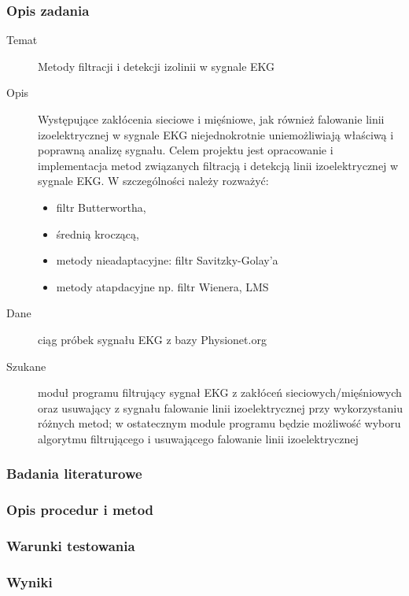 \documentclass[a4paper, 11pt]{article}
\begin{document}
\subsubsection{Opis zadania}
\label{sec:baseline:desc}

\begin{description}
\item[Temat] Metody filtracji i detekcji izolinii w sygnale EKG
\item[Opis] Występujące zakłócenia sieciowe i mięśniowe, jak również falowanie linii izoelektrycznej w sygnale EKG niejednokrotnie uniemożliwiają właściwą i poprawną analizę sygnału. Celem projektu jest opracowanie i implementacja metod związanych filtracją i detekcją linii izoelektrycznej w sygnale EKG. W szczególności należy rozważyć:
  \begin{itemize}
  \item filtr Butterwortha,
  \item średnią kroczącą,
  \item metody nieadaptacyjne: filtr Savitzky-Golay’a
  \item metody atapdacyjne np. filtr Wienera, LMS
  \end{itemize}
\item[Dane] ciąg próbek sygnału EKG z bazy Physionet.org
\item[Szukane] moduł programu filtrujący sygnał EKG z zakłóceń sieciowych/mięśniowych oraz usuwający z sygnału falowanie linii izoelektrycznej przy wykorzystaniu różnych metod; w ostatecznym module programu będzie możliwość wyboru algorytmu filtrującego i usuwającego falowanie linii izoelektrycznej
\end{description}

\subsubsection{Badania literaturowe}
\label{sec:baseline:papers}

\subsubsection{Opis procedur i metod}
\label{sec:baseline:procs}

\subsubsection{Warunki testowania}
\label{sec:baseline:tests}

\subsubsection{Wyniki}
\label{sec:baseline:results}
\end{document}

